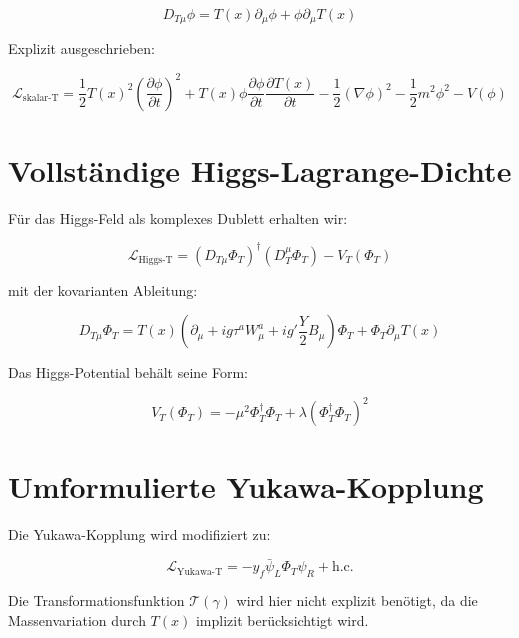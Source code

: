 \documentclass{article}
\begin{document}
	\begin{equation}
		D_{T\mu} \phi = T(x) \partial_\mu \phi + \phi \partial_\mu T(x)
	\end{equation}
	
	Explizit ausgeschrieben:
	
	\begin{equation}
		\mathcal{L}_{\text{skalar-T}} = \frac{1}{2} T(x)^2 \left( \frac{\partial \phi}{\partial t} \right)^2 + T(x) \phi \frac{\partial \phi}{\partial t} \frac{\partial T(x)}{\partial t} - \frac{1}{2} (\nabla \phi)^2 - \frac{1}{2} m^2 \phi^2 - V(\phi)
	\end{equation}
	
	\section{Vollständige Higgs-Lagrange-Dichte}
	Für das Higgs-Feld als komplexes Dublett erhalten wir:
	
	\begin{equation}
		\mathcal{L}_{\text{Higgs-T}} = (D_{T\mu} \Phi_T)^\dagger (D_T^\mu \Phi_T) - V_T(\Phi_T)
	\end{equation}
	
	mit der kovarianten Ableitung:
	
	\begin{equation}
		D_{T\mu} \Phi_T = T(x) (\partial_\mu + i g \tau^a W_\mu^a + i g' \frac{Y}{2} B_\mu) \Phi_T + \Phi_T \partial_\mu T(x)
	\end{equation}
	
	Das Higgs-Potential behält seine Form:
	
	\begin{equation}
		V_T(\Phi_T) = -\mu^2 \Phi_T^\dagger \Phi_T + \lambda (\Phi_T^\dagger \Phi_T)^2
	\end{equation}
	
	\section{Umformulierte Yukawa-Kopplung}
	Die Yukawa-Kopplung wird modifiziert zu:
	
	\begin{equation}
		\mathcal{L}_{\text{Yukawa-T}} = -y_f \bar{\psi}_L \Phi_T \psi_R + \text{h.c.}
	\end{equation}
	
	Die Transformationsfunktion \( \mathcal{T}(\gamma) \) wird hier nicht explizit benötigt, da die Massenvariation durch \( T(x) \) implizit berücksichtigt wird.
	
\end{document}
